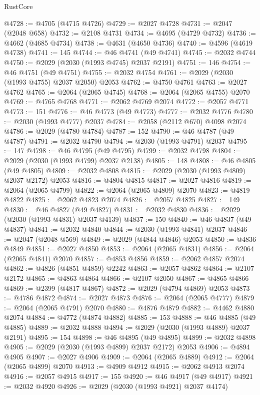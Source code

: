 \begin{lexlean}{RustCore}
\begin{coremodule}
@4728 := @4705 (@4715 @4726)
@4729 := @2027 @4728
@4731 := @2047 (@2048 @658)
@4732 := @2108 @4731
@4734 := @4695 (@4729 @4732)
@4736 := @4662 (@4685 @4734)
@4738 := @4631 (@4650 @4736)
@4740 := @4596 (@4619 @4738)
@4741 := 145
@4744 := @46 @4741 (@49 @4741)
@4745 := @2032 @4744
@4750 := @2029 (@2030 (@1993 @4745) @2037 @2191)
@4751 := 146
@4754 := @46 @4751 (@49 @4751)
@4755 := @2032 @4754
@4761 := @2029 (@2030 (@1993 @4755) @2037 @2050) @2053
@4762 := @4750 @4761
@4763 := @2027 @4762
@4765 := @2064 (@2065 @4745)
@4768 := @2064 (@2065 @4755) @2070
@4769 := @4765 @4768
@4771 := @2062 @4769 @2074
@4772 := @2057 @4771
@4773 := 151
@4776 := @46 @4773 (@49 @4773)
@4777 := @2032 @4776
@4780 := @2030 (@1993 @4777) @2037
@4784 := @2058 (@2112 @670) @4098 @2074
@4786 := @2029 (@4780 @4784)
@4787 := 152
@4790 := @46 @4787 (@49 @4787)
@4791 := @2032 @4790
@4794 := @2030 (@1993 @4791) @2037
@4795 := 147
@4798 := @46 @4795 (@49 @4795)
@4799 := @2032 @4798
@4804 := @2029 (@2030 (@1993 @4799) @2037 @2138)
@4805 := 148
@4808 := @46 @4805 (@49 @4805)
@4809 := @2032 @4808
@4815 := @2029 (@2030 (@1993 @4809) @2037 @2172) @2053
@4816 := @4804 @4815
@4817 := @2027 @4816
@4819 := @2064 (@2065 @4799)
@4822 := @2064 (@2065 @4809) @2070
@4823 := @4819 @4822
@4825 := @2062 @4823 @2074
@4826 := @2057 @4825
@4827 := 149
@4830 := @46 @4827 (@49 @4827)
@4831 := @2032 @4830
@4836 := @2029 (@2030 (@1993 @4831) @2037 @4139)
@4837 := 150
@4840 := @46 @4837 (@49 @4837)
@4841 := @2032 @4840
@4844 := @2030 (@1993 @4841) @2037
@4846 := @2047 (@2048 @569)
@4849 := @2029 (@4844 @4846) @2053
@4850 := @4836 @4849
@4851 := @2027 @4850
@4853 := @2064 (@2065 @4831)
@4856 := @2064 (@2065 @4841) @2070
@4857 := @4853 @4856
@4859 := @2062 @4857 @2074
@4862 := @4826 (@4851 @4859) @2242
@4863 := @2057 @4862
@4864 := @2107 @2172
@4865 := @4863 @4864
@4866 := @2107 @2050
@4867 := @4865 @4866
@4869 := @2399 (@4817 @4867)
@4872 := @2029 (@4794 @4869) @2053
@4873 := @4786 @4872
@4874 := @2027 @4873
@4876 := @2064 (@2065 @4777)
@4879 := @2064 (@2065 @4791) @2070
@4880 := @4876 @4879
@4882 := @4462 @4880 @2074
@4884 := @4772 (@4874 @4882)
@4885 := 153
@4888 := @46 @4885 (@49 @4885)
@4889 := @2032 @4888
@4894 := @2029 (@2030 (@1993 @4889) @2037 @2191)
@4895 := 154
@4898 := @46 @4895 (@49 @4895)
@4899 := @2032 @4898
@4905 := @2029 (@2030 (@1993 @4899) @2037 @2172) @2053
@4906 := @4894 @4905
@4907 := @2027 @4906
@4909 := @2064 (@2065 @4889)
@4912 := @2064 (@2065 @4899) @2070
@4913 := @4909 @4912
@4915 := @2062 @4913 @2074
@4916 := @2057 @4915
@4917 := 155
@4920 := @46 @4917 (@49 @4917)
@4921 := @2032 @4920
@4926 := @2029 (@2030 (@1993 @4921) @2037 @4174)

\end{coremodule}
\end{lexlean}

